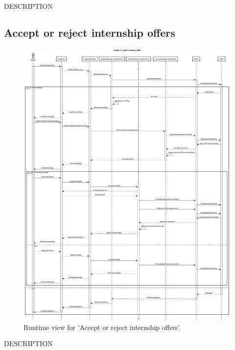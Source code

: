 DESCRIPTION


\subsection{Accept or reject internship offers}
\begin{figure}[H]
    \begin{center}
        \includegraphics[width=0.8\linewidth]{DD/LaTeX/Images/RuntimeView/EvaluationInternshipOffers.png}
        \caption{Runtime view for 'Accept or reject internship offers'.}
        \label{fig:runtime_EvaluationInternshipOffers}%
    \end{center}
\end{figure}

DESCRIPTION



